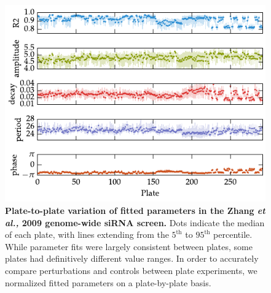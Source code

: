 \documentclass[11pt, letterpaper]{article}
\begin{document}
\begin{figure}[tbp]
  \begin{center}
    \includegraphics[]{figures/pdfs/zhang_plates.pdf}
  \end{center}
  \caption{{\bfseries Plate-to-plate variation of fitted parameters in the Zhang {\itshape et al.,} 2009 genome-wide siRNA screen.} Dots indicate the median of each plate, with lines extending from the $5^\text{th}$ to $95^\text{th}$ percentile.
While parameter fits were largely consistent between plates, some plates had definitively different value ranges. In order to accurately compare perturbations and controls between plate experiments, we normalized fitted parameters on a plate-by-plate basis.}
\label{fig:plate_variation}
\end{figure}
\end{document}
